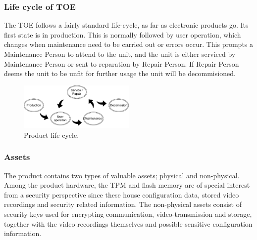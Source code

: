 \documentclass[10pt]{article}
\begin{document}
    \subsubsection{Life cycle of TOE}
	The TOE follows a fairly standard life-cycle, as far as electronic products go. 
	Its first state is in production. This is normally followed by user operation,
	which changes when maintenance need to be carried out or errors occur.
	This prompts a Maintenance Person to attend to the unit, and the unit is either
	serviced by Maintenance Person or sent to reparation by Repair Person.
	If Repair Person deems the unit to be unfit for further usage the unit 
	will be decommisioned.
      \begin{figure}[!h]
        \center
        \includegraphics[width=0.5\textwidth]{input/cycle.pdf}
        \caption{Product life cycle.}
      \end{figure}

	\subsubsection{Assets}

      The product contains two types of valuable assets; physical and
      non-physical. Among the product hardware, the TPM and flash memory
      are of special interest from a security perspective since these house
      configuration data, stored video recordings and security related
      information. The non-physical assets consist of security keys used for
      encrypting communication, video-transmission and storage, together with
      the video recordings themselves and possible sensitive configuration
      information.
\end{document}
